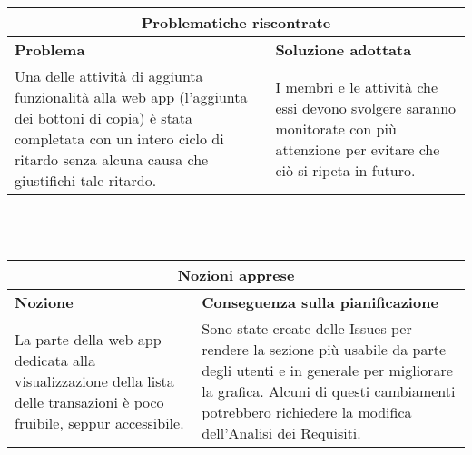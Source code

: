 \documentclass[a4paper, 12pt]{article}
\begin{document}
\begin{center}
    \begin{tabularx}{\textwidth}{|X|X|}
        \hline
        \multicolumn{2}{|c|}{\textbf{Problematiche riscontrate}}\\
        \hline
        \hline
        \textbf{Problema} & \textbf{Soluzione adottata}\\
        \hline
        Una delle attività di aggiunta funzionalità alla web app (l'aggiunta dei bottoni di copia) è stata completata con un intero ciclo di ritardo senza alcuna causa che giustifichi tale ritardo. & I membri e le attività che essi devono svolgere saranno monitorate con più attenzione per evitare che ciò si ripeta in futuro. \\
        \hline
    \end{tabularx}\\[8pt]
    \mbox{}\\
\end{center}

\begin{center}
    \begin{tabularx}{\textwidth}{|X|X|}
        \hline
        \multicolumn{2}{|c|}{\textbf{Nozioni apprese}}\\
        \hline
        \hline
        \textbf{Nozione} & \textbf{Conseguenza sulla pianificazione}\\
        \hline
        La parte della web app dedicata alla visualizzazione della lista delle transazioni è poco fruibile, seppur accessibile. & Sono state create delle Issues per rendere la sezione più usabile da parte degli utenti e in generale per migliorare la grafica. Alcuni di questi cambiamenti potrebbero richiedere la modifica dell'Analisi dei Requisiti. \\
        \hline
    \end{tabularx}\\[8pt]
    \mbox{}\\
\end{center}
\end{document}

